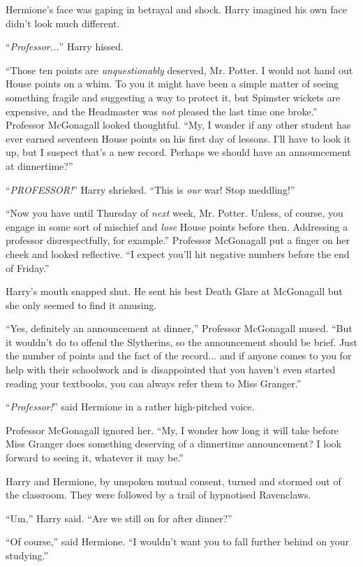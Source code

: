 Hermione's face was gaping in betrayal and shock. Harry imagined his own face didn't look much different.

``\emph{Professor...}'' Harry hissed.

``Those ten points are \emph{unquestionably} deserved, Mr. Potter. I would not hand out House points on a whim. To you it might have been a simple matter of seeing something fragile and suggesting a way to protect it, but Spimster wickets are expensive, and the Headmaster was \emph{not} pleased the last time one broke.'' Professor McGonagall looked thoughtful. ``My, I wonder if any other student has ever earned seventeen House points on his first day of lessons. I'll have to look it up, but I suspect that's a new record. Perhaps we should have an announcement at dinnertime?''

``\emph{PROFESSOR!}'' Harry shrieked. ``This is \emph{our} war! Stop meddling!''

``Now you have until Thursday of \emph{next} week, Mr. Potter. Unless, of course, you engage in some sort of mischief and \emph{lose} House points before then. Addressing a professor disrespectfully, for example.'' Professor McGonagall put a finger on her cheek and looked reflective. ``I expect you'll hit negative numbers before the end of Friday.''

Harry's mouth snapped shut. He sent his best Death Glare at McGonagall but she only seemed to find it amusing.

``Yes, definitely an announcement at dinner,'' Professor McGonagall mused. ``But it wouldn't do to offend the Slytherins, so the announcement should be brief. Just the number of points and the fact of the record... and if anyone comes to you for help with their schoolwork and is disappointed that you haven't even started reading your textbooks, you can always refer them to Miss Granger.''

``\emph{Professor!}'' said Hermione in a rather high-pitched voice.

Professor McGonagall ignored her. ``My, I wonder how long it will take before Miss Granger does something deserving of a dinnertime announcement? I look forward to seeing it, whatever it may be.''

Harry and Hermione, by unspoken mutual consent, turned and stormed out of the classroom. They were followed by a trail of hypnotised Ravenclaws.

``Um,'' Harry said. ``Are we still on for after dinner?''

``Of course,'' said Hermione. ``I wouldn't want you to fall further behind on your studying.''

